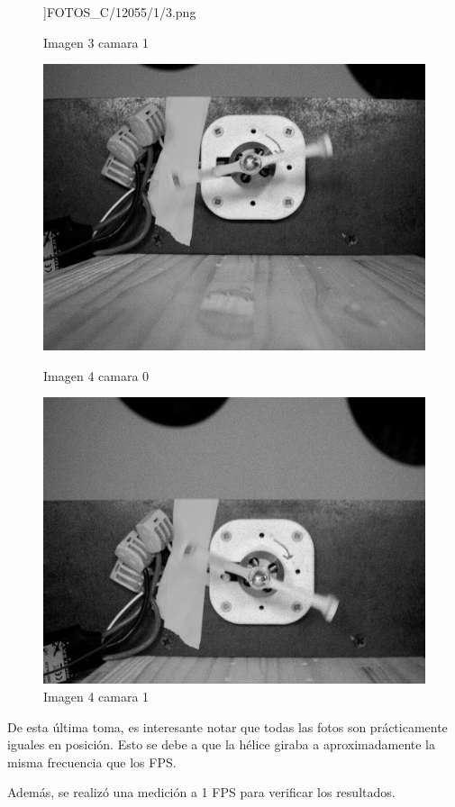\documentclass{article}
\begin{document}
\begin{figure}[H]
\begin{minipage}[b]{0.45\textwidth}
      \textwidth]{FOTOS_C/12055/1/3.png}
      \caption{Imagen 3 camara 1}
    \end{minipage}
    \begin{minipage}[b]{0.45\textwidth}
      \centering
      \includegraphics[width=0.8
      \textwidth]{FOTOS_C/12055/0/4.png}
      \caption{Imagen 4 camara 0}
    \end{minipage}
    \begin{minipage}[b]{0.45\textwidth}
      \centering
      \includegraphics[width=0.8
      \textwidth]{FOTOS_C/12055/1/4.png}
      \caption{Imagen 4 camara 1}
    \end{minipage}
\end{figure}

\noindent De esta última toma, es interesante notar que todas las fotos son prácticamente iguales en posición. Esto se debe a que la hélice giraba a aproximadamente la misma frecuencia que los FPS.

\newpage
Además, se realizó una medición a 1 FPS para verificar los resultados.
\end{document}
